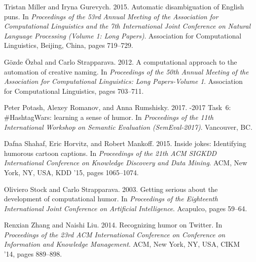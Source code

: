 \documentclass[11pt,a4paper]{article}
\begin{document}
\begin{thebibliography}{}
Tristan Miller and Iryna Gurevych. 2015.
\newblock Automatic disambiguation of English puns.
\newblock In {\em Proceedings of the 53rd Annual Meeting of the Association for
  Computational Linguistics and the 7th International Joint Conference on
  Natural Language Processing (Volume 1: Long Papers)\/}. Association for
  Computational Linguistics, Beijing, China, pages 719--729.

G{\"o}zde {\"O}zbal and Carlo Strapparava. 2012.
\newblock A computational approach to the automation of creative naming.
\newblock In {\em Proceedings of the 50th Annual Meeting of the Association for
  Computational Linguistics: Long Papers-Volume 1\/}. Association for
  Computational Linguistics, pages 703--711.

Peter Potash, Alexey Romanov, and Anna Rumshisky. 2017.
-2017 {Task}~6: {\#HashtagWars:} learning a sense of humor.
\newblock In {\em Proceedings of the 11th International Workshop on Semantic
  Evaluation (SemEval-2017)\/}. Vancouver, BC.

Dafna Shahaf, Eric Horvitz, and Robert Mankoff. 2015.
\newblock Inside jokes: Identifying humorous cartoon captions.
\newblock In {\em Proceedings of the 21th ACM SIGKDD International Conference
  on Knowledge Discovery and Data Mining\/}. ACM, New York, NY, USA, KDD '15,
  pages 1065--1074.

Oliviero Stock and Carlo Strapparava. 2003.
\newblock Getting serious about the development of computational humor.
\newblock In {\em Proceedings of the Eighteenth International Joint Conference
  on Artificial Intelligence\/}. Acapulco, pages 59--64.

Renxian Zhang and Naishi Liu. 2014.
\newblock Recognizing humor on Twitter.
\newblock In {\em Proceedings of the 23rd ACM International Conference on
  Conference on Information and Knowledge Management\/}. ACM, New York, NY,
  USA, CIKM '14, pages 889--898.

\end{thebibliography}
\end{document}
